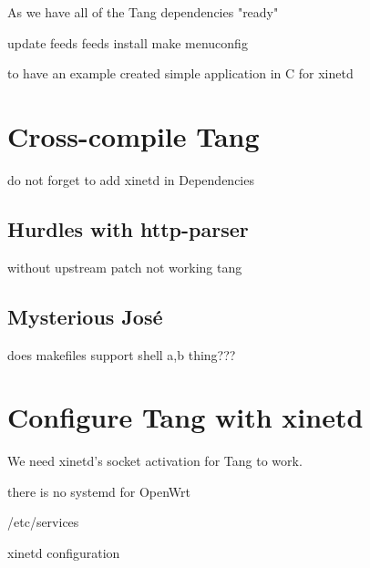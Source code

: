 As we have all of the Tang dependencies "ready"

update feeds
feeds install
make menuconfig
\newpage



to have an example created simple application in C for xinetd
\newpage

\section{Cross-compile Tang}

do not forget to add xinetd in Dependencies
\newpage

\subsection{Hurdles with http-parser}\label{http_parser_problems}

without upstream patch not working tang
\newpage

\subsection{Mysterious José}

does makefiles support shell {a,b} thing???
\newpage

\section{Configure Tang with xinetd}

We need xinetd's socket activation for Tang to work.


there is no systemd for OpenWrt

/etc/services

xinetd configuration

\subsection{}


